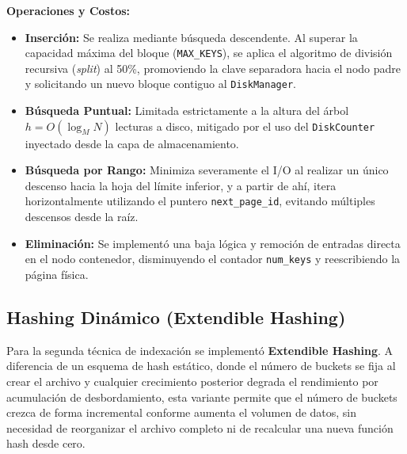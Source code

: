 \documentclass[a4paper,12pt]{article}
\begin{document}
\textbf{Operaciones y Costos:}
\begin{itemize}
    \item \textbf{Inserción:} Se realiza mediante búsqueda descendente. Al
    superar la capacidad máxima del bloque (\texttt{MAX\_KEYS}), se aplica el algoritmo de
    división recursiva (\textit{split}) al 50\%, promoviendo la clave separadora
    hacia el nodo padre y solicitando un nuevo bloque contiguo al \texttt{DiskManager}.
    \item \textbf{Búsqueda Puntual:} Limitada estrictamente a la altura del
    árbol $h = O(\log_M N)$ lecturas a disco, mitigado por el uso del
    \texttt{DiskCounter} inyectado desde la capa de almacenamiento.
    \item \textbf{Búsqueda por Rango:} Minimiza severamente el I/O al realizar
    un único descenso hacia la hoja del límite inferior, y a partir de ahí,
    itera horizontalmente utilizando el puntero \texttt{next\_page\_id}, evitando
    múltiples descensos desde la raíz.
    \item \textbf{Eliminación:} Se implementó una baja lógica y remoción de entradas directa
    en el nodo contenedor, disminuyendo el contador \texttt{num\_keys} y reescribiendo la página física.
\end{itemize}

\subsection{Hashing Dinámico (Extendible Hashing)}

Para la segunda técnica de indexación se implementó \textbf{Extendible Hashing}.
A diferencia de un esquema de hash estático, donde el número de buckets se fija
al crear el archivo y cualquier crecimiento posterior degrada el rendimiento por
acumulación de desbordamiento, esta variante permite que el número de buckets
crezca de forma incremental conforme aumenta el volumen de datos, sin necesidad
de reorganizar el archivo completo ni de recalcular una nueva función hash desde
cero.
\end{document}
